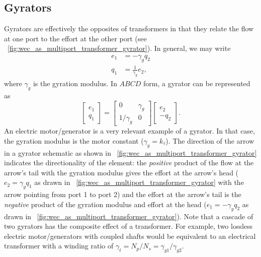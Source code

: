 \documentclass[twocolumn]{autart}
\begin{document}
\subsection{Gyrators}\label{sec:gyrators}
Gyrators are effectively the opposites of transformers in that they relate the flow at one port to the effort at the other port (see \figurename~\ref{fig:wec_as_multiport_transformer_gyrator}).
In general, we may write
%
\begin{subequations}
        \begin{align}
               e_1 &= - \gamma_g q_2 \\
               q_1 &= \frac{1}{\gamma_g} e_2 ,
        \end{align}
        \label{eq:gyrator_eom}%
\end{subequations}
%
where $\gamma_g$ is the gyration modulus.
In $ABCD$ form, a gyrator can be represented as
%
\begin{equation}
        \begin{bmatrix}
                e_1 \\ q_1
        \end{bmatrix}
        =
        \begin{bmatrix}
                0 & \gamma_g \\ 1/\gamma_g & 0
        \end{bmatrix}
        \begin{bmatrix}
                e_2 \\ - q_2
        \end{bmatrix} .
        \label{eq:gyrator_abcd}
\end{equation}
%
An electric motor/generator is a very relevant example of a gyrator.
In that case, the gyration modulus is the motor constant ($\gamma_g=k_\tau$).
The direction of the arrow in a gyrator schematic as shown in \figurename~\ref{fig:wec_as_multiport_transformer_gyrator} indicates the directionality of the element: the \emph{positive} product of the flow at the arrow's tail with the gyration modulus gives the effort at the arrow's head ($e_2 = \gamma_g q_1$ as drawn in \figurename~\ref{fig:wec_as_multiport_transformer_gyrator} with the arrow pointing from port 1 to port 2) and the effort at the arrow's tail is the \emph{negative} product of the gyration modulus and effort at the head ($e_1= - \gamma_g q_2$ as drawn in \figurename~\ref{fig:wec_as_multiport_transformer_gyrator}).
Note that a cascade of two gyrators has the composite effect of a transformer.
For example, two lossless electric motor/generators with coupled shafts would be equivalent to an electrical transformer with a winding ratio of $\gamma_t=N_p/N_s=\gamma_{g1}/\gamma_{g2}$.
\end{document}
